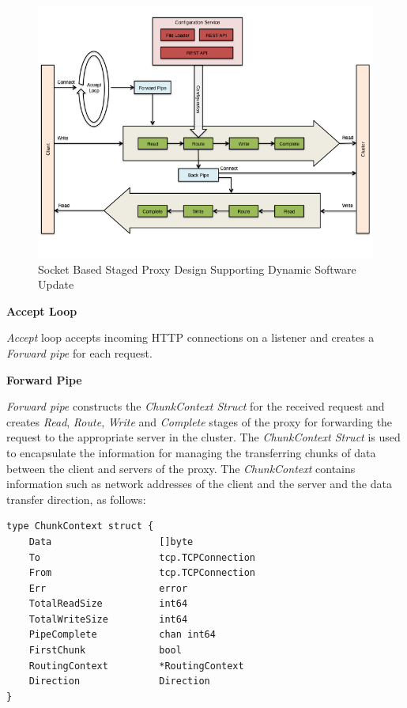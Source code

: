 \documentclass[a4paper,11pt,twoside]{article}
\begin{document}
\begin{figure}[!ht]
  \centering
     \includegraphics[scale=0.30]{proxy}
  \caption{Socket Based Staged Proxy Design Supporting Dynamic Software Update}
  \label{proxy}
\end{figure}

\noindent
\textbf{Accept Loop} 

\noindent
\textit{Accept} loop accepts incoming HTTP connections on a listener and creates a \textit{Forward pipe} for each request.\bigskip 

\noindent
\textbf{Forward Pipe} 

\noindent
\textit{Forward pipe} constructs the \textit{ChunkContext Struct} for the received request and creates \textit{Read}, \textit{Route}, \textit{Write} and \textit{Complete} stages of the proxy for forwarding the request to the appropriate server in the cluster. The \textit{ChunkContext Struct} is used to encapsulate the information for managing the transferring chunks of data between the client and servers of the proxy. The \textit{ChunkContext} contains information such as network addresses of the client and the server and the data transfer direction, as follows: \bigskip  

\begin{lstlisting}[language=terminal, xleftmargin= .5in, xrightmargin= 1.75in]
type ChunkContext struct {
	Data                   []byte
	To                     tcp.TCPConnection
	From                   tcp.TCPConnection
	Err                    error
	TotalReadSize          int64
	TotalWriteSize         int64
	PipeComplete           chan int64
	FirstChunk             bool
	RoutingContext         *RoutingContext
	Direction              Direction
}
\end{lstlisting} 
\end{document}

